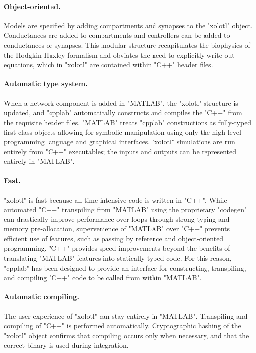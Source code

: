\documentclass{frontiersSCNS} %
\begin{document}
\paragraph{Object-oriented.}
Models are specified by adding compartments and synapses to the "xolotl" object. Conductances are added to compartments and controllers can be added to conductances or synapses. This modular structure recapitulates the biophysics of the Hodgkin-Huxley formalism and obviates the need to explicitly write out equations, which in "xolotl" are contained within "C++" header files.

\paragraph{Automatic type system.}
When a network component is added in "MATLAB", the "xolotl" structure is updated, and "cpplab" automatically constructs and compiles the "C++" from the requisite header files. "MATLAB" treats "cpplab" constructions as fully-typed first-class objects allowing for symbolic manipulation using only the high-level programming language and graphical interfaces. "xolotl" simulations are run entirely from "C++" executables; the inputs and outputs can be represented entirely in "MATLAB".

\paragraph{Fast.}
"xolotl" is fast because all time-intensive code is written in "C++". While automated "C++" transpiling from "MATLAB" using the proprietary "codegen" can drastically improve performance over loops through strong typing and memory pre-allocation, supervenience of "MATLAB" over "C++" prevents efficient use of features, such as passing by reference and object-oriented programming. "C++" provides speed improvements beyond the benefits of translating "MATLAB" features into statically-typed code. For this reason, "cpplab" has been designed to provide an interface for constructing, transpiling, and compiling "C++" code to be called from within "MATLAB".

\paragraph{Automatic compiling.}
The user experience of "xolotl" can stay entirely in "MATLAB". Transpiling and compiling of "C++" is performed automatically. Cryptographic hashing of the "xolotl" object confirms that compiling occurs only when necessary, and that the correct binary is used during integration.
\end{document}
